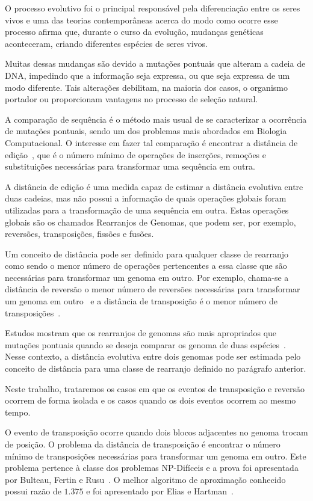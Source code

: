 O processo evolutivo foi o principal responsável pela diferenciação
entre os seres vivos e uma das teorias contemporâneas acerca do modo
como ocorre esse processo afirma que, durante o curso da evolução,
mudanças genéticas aconteceram, criando diferentes espécies de seres
vivos.

Muitas dessas mudanças são devido a mutações pontuais que alteram a
cadeia de DNA, impedindo que a informação seja expressa, ou que seja
expressa de um modo diferente. Tais alterações debilitam, na maioria
dos casos, o organismo portador ou proporcionam vantagens no processo
de seleção natural.

A comparação de sequência é o método mais usual de se caracterizar a
ocorrência de mutações pontuais, sendo um dos problemas mais abordados
em Biologia Computacional. O interesse em fazer tal comparação é
encontrar a distância de edição~\cite{SetubalMeidanis*1997}, que é o
número mínimo de operações de inserções, remoções e substituições
necessárias para transformar uma sequência em outra.

A distância de edição é uma medida capaz de estimar a distância
evolutiva entre duas cadeias, mas não possui a informação de quais
operações globais foram utilizadas para a transformação de uma
sequência em outra. Estas operações globais são os chamados
Rearranjos de Genomas, que podem ser, por exemplo, reversões,
transposições, fissões e fusões.

Um conceito de distância pode ser definido para qualquer classe de
rearranjo como sendo o menor número de operações pertencentes a essa
classe que são necessárias para transformar um genoma em outro. Por
exemplo, chama-se a distância de reversão o menor número de reversões
necessárias para transformar um genoma em
outro~\cite{BafnaPevzner*1996} e a distância de transposição é o menor
número de transposições~\cite{BafnaPevzner*1998}.

Estudos mostram que os rearranjos de genomas são mais apropriados que
mutações pontuais quando se deseja comparar os genoma de duas
espécies~\cite{PalmerHerbon*1988}. Nesse contexto, a distância
evolutiva entre dois genomas pode ser estimada pelo conceito de
distância para uma classe de rearranjo definido no parágrafo anterior.

Neste trabalho, trataremos os casos em que os eventos de transposição e
reversão ocorrem de forma isolada e os casos quando os dois eventos
ocorrem ao mesmo tempo.

O evento de transposição ocorre quando dois blocos adjacentes no
genoma trocam de posição. O problema da distância de transposição é
encontrar o número mínimo de transposições necessárias para
transformar um genoma em outro. Este problema pertence à classe dos
problemas NP-Difíceis e a prova foi apresentada por Bulteau, Fertin e
Rusu~\cite{BulteauFertinRusu*2010}. O melhor algoritmo de aproximação
conhecido possui razão de $1.375$ e foi apresentado por Elias e
Hartman~\cite{EliasHartman*2006}.

